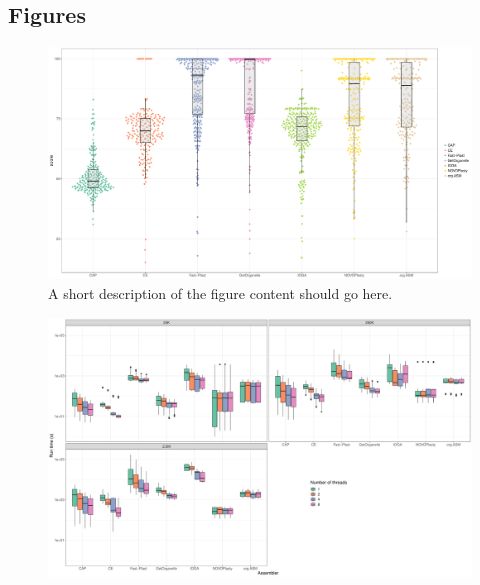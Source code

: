 \documentclass{bmcart}
\begin{document}
\begin{backmatter}



\section*{Figures}
  \begin{figure}[h!]
  \includegraphics[width=\textwidth]{plots/swarm.pdf}
  \caption{
      A short description of the figure content
      should go here.}
      \label{fig:swarmplot}
      \end{figure}

\begin{figure}[h!]
  \includegraphics[width=\textwidth]{plots/comp_time_log.pdf}
  \caption{
  }
        \label{fig:performance_runtime}
      \end{figure}


\end{backmatter}
\end{document}
